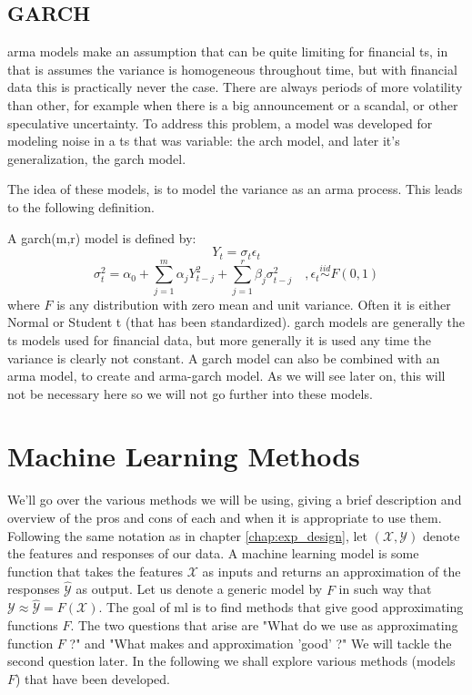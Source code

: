 \subsection{GARCH}
\acrshort{arma} models make an assumption that can be quite limiting for financial \acrlong{ts}, in that is assumes the variance is homogeneous throughout time, but with financial data this is practically never the case. There are always periods of more volatility than other, for example when there is a big announcement or a scandal, or other speculative uncertainty. 
To address this problem, a model was developed for modeling noise in a \acrlong{ts} that was variable: the \acrfull{arch} model, and later it's generalization, the \acrfull{garch} model.

The idea of these models, is to model the variance as an \acrshort{arma} process. This leads to the following definition.

A \acrshort{garch}(m,r) model is defined by:
$$
Y_t = \sigma_t \epsilon_t
$$
$$
\sigma_t^2 = \alpha_0 + \sum_{j=1}^m \alpha_j Y_{t-j}^2 + \sum_{j=1}^r \beta_j \sigma_{t-j}^2
\quad, \epsilon_t \stackrel{iid}{\sim} F(0,1)
$$
where $F$ is any distribution with zero mean and unit variance. Often it is either Normal or Student t (that has been standardized).
\acrshort{garch} models are generally the \acrlong{ts} models used for financial data, but more generally it is used any time the variance is clearly not constant. A \acrshort{garch} model can also be combined with an \acrshort{arma} model, to create and \acrshort{arma}-\acrshort{garch} model. As we will see later on, this will not be necessary here so we will not go further into these models.

\section{Machine Learning Methods}
We'll go over the various methods we will be using, giving a brief description and overview of the pros and cons of each and when it is appropriate to use them.
Following the same notation as in chapter \ref{chap:exp_design}, let $(\mathcal{X},\mathcal{Y})$ denote the features and responses of our data. A machine learning model is some function that takes the features $\mathcal{X}$ as inputs and returns an approximation of the responses $\hat{\mathcal{Y}}$ as output. Let us denote a generic model by $F$ in such way that $\mathcal{Y} \approx \hat{\mathcal{Y}}=F(\mathcal{X})$.
The goal of \acrshort{ml} is to find methods that give good approximating functions $F$. The two questions that arise are "What do we use as approximating function $F$ ?" and "What makes and approximation 'good' ?" We will tackle the second question later. In the following we shall explore various methods (models $F$) that have been developed.

